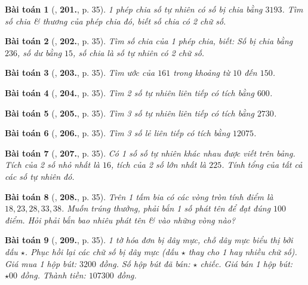 \documentclass{article}
\numberwithin{equation}{section}
\newtheorem{baitoan}{Bài toán}[section]
\begin{document}
\begin{baitoan}[\cite{Binh_Toan_6_tap_1}, \textbf{201.}, p. 35]
	1 phép chia số tự nhiên có số bị chia bằng $3193$. Tìm số chia \& thương của phép chia đó, biết số chia có 2 chữ số.
\end{baitoan}

\begin{baitoan}[\cite{Binh_Toan_6_tap_1}, \textbf{202.}, p. 35]
	Tìm số chia của 1 phép chia, biết: Số bị chia bằng $236$, số dư bằng $15$, số chia là số tự nhiên có 2 chữ số.
\end{baitoan}	

\begin{baitoan}[\cite{Binh_Toan_6_tap_1}, \textbf{203.}, p. 35]
	Tìm ước của $161$ trong khoảng từ $10$ đến $150$.
\end{baitoan}

\begin{baitoan}[\cite{Binh_Toan_6_tap_1}, \textbf{204.}, p. 35]
	Tìm 2 số tự nhiên liên tiếp có tích bằng $600$.
\end{baitoan}

\begin{baitoan}[\cite{Binh_Toan_6_tap_1}, \textbf{205.}, p. 35]
	Tìm 3 số tự nhiên liên tiếp có tích bằng $2730$.
\end{baitoan}

\begin{baitoan}[\cite{Binh_Toan_6_tap_1}, \textbf{206.}, p. 35]
	Tìm 3 số lẻ liên tiếp có tích bằng $12075$.
\end{baitoan}

\begin{baitoan}[\cite{Binh_Toan_6_tap_1}, \textbf{207.}, p. 35]
	Có 1 số số tự nhiên khác nhau được viết trên bảng. Tích của 2 số nhỏ nhất là $16$, tích của 2 số lớn nhất là $225$. Tính tổng của tất cả các số tự nhiên đó.
\end{baitoan}

\begin{baitoan}[\cite{Binh_Toan_6_tap_1}, \textbf{208.}, p. 35]
	Trên 1 tấm bia có các vòng tròn tính điểm là $18,23,28,33,38$. Muốn trúng thưởng, phải bắn 1 số phát tên để đạt đúng $100$ điểm. Hỏi phải bắn bao nhiêu phát tên \& vào những vòng nào?
\end{baitoan}

\begin{baitoan}[\cite{Binh_Toan_6_tap_1}, \textbf{209.}, p. 35]
	1 tờ hóa đơn bị dây mực, chỗ dây mực biểu thị bởi dấu $\star$. Phục hồi lại các chữ số bị dây mực (dấu $\star$ thay cho 1 hay nhiều chữ số). Giá mua 1 hộp bút: $3200$ đồng. Số hộp bút đã bán: $\star$ chiếc. Giá bán 1 hộp bút: $\star00$ đồng. Thành tiền: $107300$ đồng.
\end{baitoan}
\end{document}
